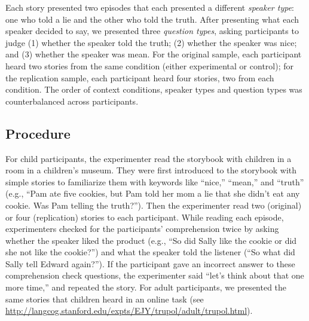 \documentclass[oneside]{report}
\begin{document}
Each story presented two episodes that each presented a different
\emph{speaker type}: one who told a lie and the other who told the
truth. After presenting what each speaker decided to say, we presented
three \emph{question types}, asking participants to judge (1) whether
the speaker told the truth; (2) whether the speaker was nice; and (3)
whether the speaker was mean. For the original sample, each participant
heard two stories from the same condition (either experimental or
control); for the replication sample, each participant heard four
stories, two from each condition. The order of context conditions,
speaker types and question types was counterbalanced across
participants.

\subsection{Procedure}\label{procedure-3}

For child participants, the experimenter read the storybook with
children in a room in a children's museum. They were first introduced to
the storybook with simple stories to familiarize them with keywords like
``nice,'' ``mean,'' and ``truth'' (e.g., ``Pam ate five cookies, but Pam
told her mom a lie that she didn't eat any cookie. Was Pam telling the
truth?''). Then the experimenter read two (original) or four
(replication) stories to each participant. While reading each episode,
experimenters checked for the participants' comprehension twice by
asking whether the speaker liked the product (e.g., ``So did Sally like
the cookie or did she not like the cookie?'') and what the speaker told
the listener (``So what did Sally tell Edward again?''). If the
participant gave an incorrect answer to these comprehension check
questions, the experimenter said ``let's think about that one more
time,'' and repeated the story. For adult participants, we presented the
same stories that children heard in an online task (see
\url{http://langcog.stanford.edu/expts/EJY/trupol/adult/trupol.html}).
\end{document}
